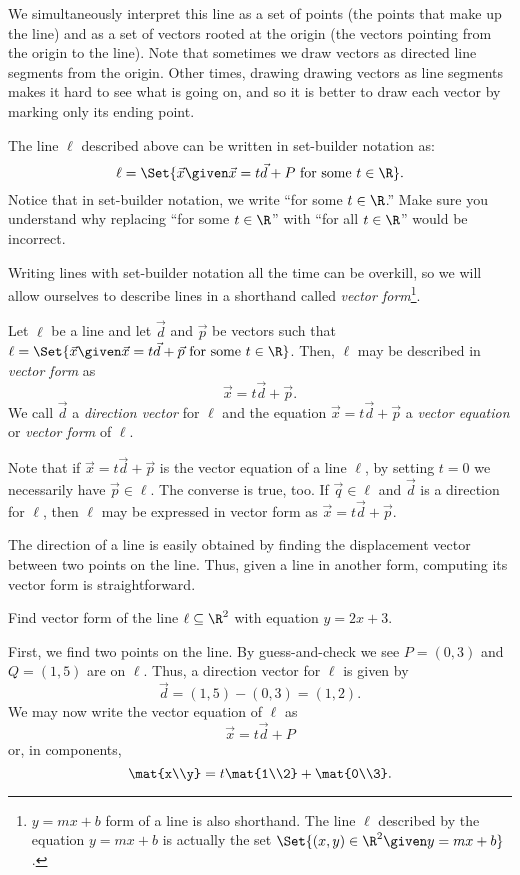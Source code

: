 We simultaneously interpret this line as a set of points (the points that make up
the line) and as a set of vectors 
rooted at the origin (the vectors pointing from the origin to the line).
Note that sometimes we draw vectors as directed line segments from the origin.
Other times, drawing drawing vectors as line segments makes
it hard to see what is going on, and so it is better to draw
each vector by marking only its ending point.


The line $\ell$ described above can be written in set-builder notation
as:
\[
	\ell=\Set{\vec x\given \vec x=t\vec d+P\text{ for some }t\in \R}.
\]
Notice that in set-builder notation, we write ``for some $t\in \R$.'' Make sure you
understand why replacing ``for some $t\in\R$'' with ``for
all $t\in \R$'' would be incorrect.

Writing lines with set-builder notation all the time can be overkill,
so we will allow ourselves to describe lines in a shorthand called \emph{vector form}\footnote{
	$y=mx+b$ form of a line is also shorthand.  The line $\ell$ described by the equation
	$y=mx+b$ is actually the set $\Set{(x,y)\in\R^2\given y=mx+b}$.
}.

\begin{definition}
	Let $\ell$ be a line and let $\vec d$ and $\vec p$ be vectors such that
	$\ell=\Set{\vec x\given \vec x=t\vec d+\vec p\text{ for some }t\in\R}$. Then,
	$\ell$ may be  described in \emph{vector form} as
	\[
		\vec x=t\vec d+\vec p.
	\]
	We call $\vec d$ a
	\emph{direction vector} for $\ell$ and the equation $\vec x=t\vec d+\vec p$ a
	\emph{vector equation} or \emph{vector form}
	of $\ell$.
\end{definition}

Note that if $\vec x=t\vec d+\vec p$ is the vector equation of a line $\ell$, by setting $t=0$
we necessarily have $\vec p\in\ell$. The converse is true, too. If $\vec q\in \ell$ and 
$\vec d$ is a direction for $\ell$, then $\ell$ may be expressed in vector form as $\vec x=t\vec d+\vec p$.

The direction of a line is easily obtained by finding the displacement vector between two points
on the line.  Thus, given a line in another form, computing its vector form is straightforward.
\begin{example}
	Find vector form of the line $\ell\subseteq\R^2$ with equation $y=2x+3$.

	First, we find two
	points on the line.  By guess-and-check we see $P=(0,3)$ and $Q=(1,5)$ are on $\ell$.
	Thus, a direction vector for $\ell$ is given by
	\[
		\vec d = (1,5)-(0,3)=(1,2).
	\]
	We may now write the vector equation of $\ell$ as
	\[
		\vec x=t\vec d+P
	\]
	or, in components,
	\[
		\mat{x\\y} = t\mat{1\\2}+\mat{0\\3}.
	\]
\end{example}


